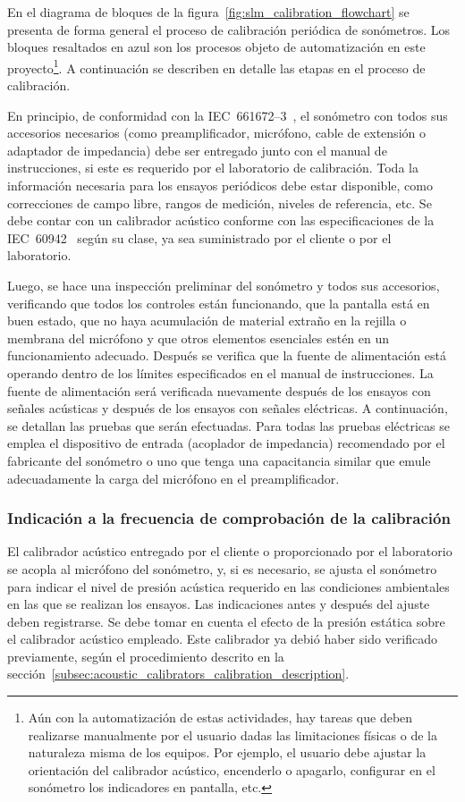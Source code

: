 %
En el diagrama de bloques de la figura~\ref{fig:slm_calibration_flowchart} se presenta de forma general el proceso de calibración periódica de sonómetros.
Los bloques resaltados en azul son los procesos objeto de automatización en este proyecto\footnote{Aún con la automatización de estas actividades, hay tareas que deben realizarse manualmente por el usuario dadas las limitaciones físicas o de la naturaleza misma de los equipos. Por ejemplo, el usuario debe ajustar la orientación del calibrador acústico, encenderlo o apagarlo, configurar en el sonómetro los indicadores en pantalla, etc.}.
A continuación se describen en detalle las etapas en el proceso de calibración.

En principio, de conformidad con la \mbox{IEC 661672--3}~\citeyearpar{IEC_TC29_2013_3}, el sonómetro con todos sus accesorios necesarios (como preamplificador, micrófono, cable de extensión o adaptador de impedancia) debe ser entregado junto con el manual de instrucciones, si este es requerido por el laboratorio de calibración.
Toda la información necesaria para los ensayos periódicos debe estar disponible, como correcciones de campo libre, rangos de medición, niveles de referencia, etc.
Se debe contar con un calibrador acústico conforme con las especificaciones de la \mbox{IEC 60942}~\citeyearpar{IEC_TC29_2017} según su clase, ya sea suministrado por el cliente o por el laboratorio.

Luego, se hace una inspección preliminar del sonómetro y todos sus accesorios, verificando que todos los controles están funcionando, que la pantalla está en buen estado, que no haya acumulación de material extraño en la rejilla o membrana del micrófono y que otros elementos esenciales estén en un funcionamiento adecuado.
Después se verifica que la fuente de alimentación está operando dentro de los límites especificados en el manual de instrucciones.
La fuente de alimentación será verificada nuevamente después de los ensayos con señales acústicas y después de los ensayos con señales eléctricas.
A continuación, se detallan las pruebas que serán efectuadas.
Para todas las pruebas eléctricas se emplea el dispositivo de entrada (acoplador de impedancia) recomendado por el fabricante del sonómetro o uno que tenga una capacitancia similar que emule adecuadamente la carga del micrófono en el preamplificador.

\subsubsection{Indicación a la frecuencia de comprobación de la calibración}
El calibrador acústico entregado por el cliente o proporcionado por el laboratorio se acopla al micrófono del sonómetro, y, si es necesario, se ajusta el sonómetro para indicar el nivel de presión acústica requerido en las condiciones ambientales en las que se realizan los ensayos.
Las indicaciones antes y después del ajuste deben registrarse.
Se debe tomar en cuenta el efecto de la presión estática sobre el calibrador acústico empleado.
Este calibrador ya debió haber sido verificado previamente, según el procedimiento descrito en la sección~\ref{subsec:acoustic_calibrators_calibration_description}.

